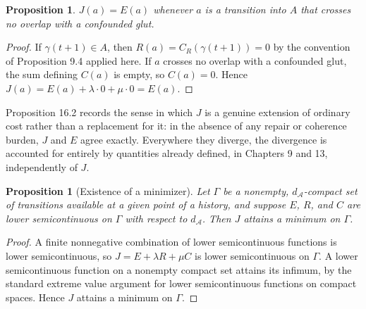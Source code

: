 \documentclass[11pt]{book}
\newtheorem{proposition}[theorem]{Proposition}
\begin{document}
\begin{proposition}
$J(a) = E(a)$ whenever $a$ is a transition into $A$ that crosses no overlap with a confounded glut.
\end{proposition}

\begin{proof}
If $\gamma(t+1) \in A$, then $R(a) = C_R(\gamma(t+1)) = 0$ by the convention of Proposition 9.4 applied here. If $a$ crosses no overlap with a confounded glut, the sum defining $C(a)$ is empty, so $C(a) = 0$. Hence $J(a) = E(a) + \lambda \cdot 0 + \mu \cdot 0 = E(a)$.
\end{proof}

Proposition 16.2 records the sense in which $J$ is a genuine extension of ordinary cost rather than a replacement for it: in the absence of any repair or coherence burden, $J$ and $E$ agree exactly. Everywhere they diverge, the divergence is accounted for entirely by quantities already defined, in Chapters 9 and 13, independently of $J$.

\begin{proposition}[Existence of a minimizer]
Let $\Gamma$ be a nonempty, $d_{\mathcal A}$-compact set of transitions available at a given point of a history, and suppose $E$, $R$, and $C$ are lower semicontinuous on $\Gamma$ with respect to $d_{\mathcal A}$. Then $J$ attains a minimum on $\Gamma$.
\end{proposition}

\begin{proof}
A finite nonnegative combination of lower semicontinuous functions is lower semicontinuous, so $J = E + \lambda R + \mu C$ is lower semicontinuous on $\Gamma$. A lower semicontinuous function on a nonempty compact set attains its infimum, by the standard extreme value argument for lower semicontinuous functions on compact spaces. Hence $J$ attains a minimum on $\Gamma$.
\end{proof}
\end{document}
